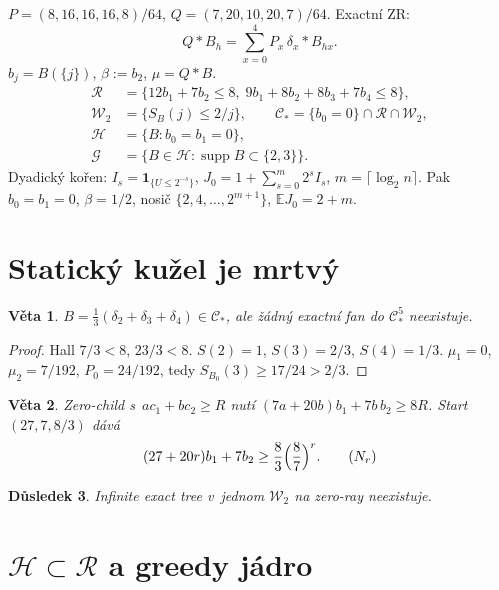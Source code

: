 \documentclass[11pt,a4paper]{article}
\newtheorem{theorem}{Věta}[section]
\newtheorem{corollary}[theorem]{Důsledek}
\theoremstyle{definition}
\theoremstyle{remark}
\newcommand{\E}{\mathbb E}
\newcommand{\cC}{\mathcal C}
\newcommand{\cG}{\mathcal G}
\newcommand{\cH}{\mathcal H}
\newcommand{\cR}{\mathcal R}
\newcommand{\cW}{\mathcal W}
\newcommand{\ind}{\mathbf 1}
\begin{document}
\(P=(8,16,16,16,8)/64\), \(Q=(7,20,10,20,7)/64\). Exactní ZR:
\begin{equation}
\label{eq:zr}
Q*B_h=\sum_{x=0}^4 P_x\,\delta_x*B_{hx}.
\end{equation}
\(b_j=B(\{j\})\), \(\beta:=b_2\), \(\mu=Q*B\).
\begin{align*}
\cR&=\bigl\{12b_1+7b_2\le 8,\;
9b_1+8b_2+8b_3+7b_4\le 8\bigr\},\\
\cW_2&=\bigl\{S_B(j)\le 2/j\bigr\},\qquad
\cC_\ast=\{b_0=0\}\cap\cR\cap\cW_2,\\
\cH&=\{B:b_0=b_1=0\},\\
\cG&=\{B\in\cH:\operatorname{supp}B\subset\{2,3\}\}.
\end{align*}
Dyadický kořen: \(I_s=\ind_{\{U\le 2^{-s}\}}\), \(J_0=1+\sum_{s=0}^m 2^s I_s\), \(m=\lceil\log_2 n\rceil\).
Pak \(b_0=b_1=0\), \(\beta=1/2\), nosič \(\{2,4,\dots,2^{m+1}\}\), \(\E J_0=2+m\).

\section{Statický kužel je mrtvý}

\begin{theorem}
\label{thm:no-static}
\(B=\frac13(\delta_2+\delta_3+\delta_4)\in\cC_\ast\), ale žádný exactní fan do \(\cC_\ast^5\) neexistuje.
\end{theorem}

\begin{proof}
Hall \(7/3<8\), \(23/3<8\). \(S(2)=1\), \(S(3)=2/3\), \(S(4)=1/3\).
\(\mu_1=0\), \(\mu_2=7/192\), \(P_0=24/192\), tedy \(S_{B_0}(3)\ge 17/24>2/3\).
\end{proof}

\begin{theorem}
\label{thm:Nr}
Zero-child s~\(a c_1+b c_2\ge R\) nutí \((7a+20b)b_1+7b\,b_2\ge 8R\).
Start \((27,7,8/3)\) dává
\begin{equation}
\label{eq:Nr}
(27+20r)b_1+7b_2\ge\frac83\Bigl(\frac87\Bigr)^r. \tag{\(N_r\)}
\end{equation}
\end{theorem}

\begin{corollary}
Infinite exact tree v~jednom \(\cW_2\) na zero-ray neexistuje.
\end{corollary}

\section{\(\cH\subset\cR\) a greedy jádro}
\end{document}
